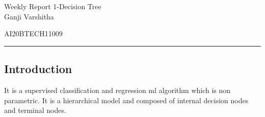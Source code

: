 \documentclass[12pt,letterpaper, onecolumn]{exam}
\begin{document}
\newtheorem{theorem}{Theorem}[section]
\newtheorem{problem}{Problem}
\newtheorem{proposition}{Proposition}[section]
\newtheorem{lemma}{Lemma}[section]
\newtheorem{corollary}[theorem]{Corollary}
\newtheorem{example}{Example}[section]
\newtheorem{definition}[problem]{Definition}

\newcommand{\BEQA}{\begin{eqnarray}}
\newcommand{\EEQA}{\end{eqnarray}}
\newcommand{\define}{\stackrel{\triangle}{=}}

\raggedbottom
\setlength{\parindent}{0pt}
\providecommand{\mbf}{\mathbf}
\providecommand{\norm}[1]{\lVert#1\rVert}
\providecommand{\pr}[1]{\ensuremath{\Pr\left(#1\right)}}
\providecommand{\qfunc}[1]{\ensuremath{Q\left(#1\right)}}
\providecommand{\sbrak}[1]{\ensuremath{{}\left[#1\right]}}
\providecommand{\lsbrak}[1]{\ensuremath{{}\left[#1\right.}}
\providecommand{\rsbrak}[1]{\ensuremath{{}\left.#1\right]}}
\providecommand{\brak}[1]{\ensuremath{\left(#1\right)}}
\providecommand{\lbrak}[1]{\ensuremath{\left(#1\right.}}
\providecommand{\rbrak}[1]{\ensuremath{\left.#1\right)}}
\providecommand{\cbrak}[1]{\ensuremath{\left\{#1\right\}}}
\providecommand{\lcbrak}[1]{\ensuremath{\left\{#1\right.}}
\providecommand{\rcbrak}[1]{\ensuremath{\left.#1\right\}}}
\let\vec\mathbf




\begingroup  
    \centering
    
    \LARGE Weekly Report 1-Decision Tree \\[0.5em]

    \large Ganji Varshitha\par
    \large AI20BTECH11009\par
\endgroup
\rule{\textwidth}{0.4pt}
\pointsdroppedatright   %
\printanswers
\newcommand\Solution{
  \textbf{Solution:}\hspace{3mm}}
\newcommand{\myvec}[1]{\ensuremath{\begin{bmatrix}#1\end{bmatrix}}}

\subsection*{Introduction}
It is a supervised classification and regression ml algorithm which is non parametric. It is a hierarchical model and composed of internal decision nodes and terminal nodes.
\end{document}
